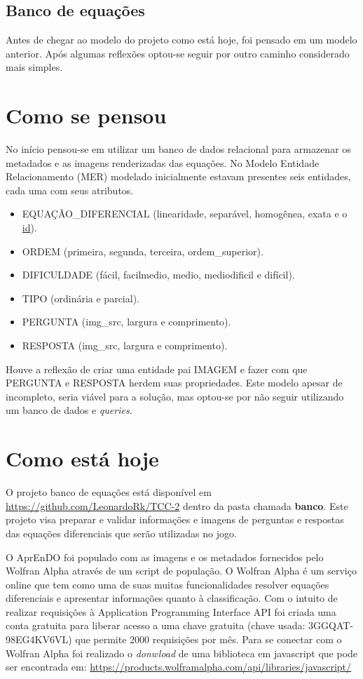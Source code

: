 \section[Banco de equações]{Banco de equações}
Antes de chegar ao modelo do projeto como está hoje, foi pensado em um modelo anterior. Após algumas reflexões
optou-se seguir por outro caminho considerado mais simples.

\chapter[Como se pensou]{Como se pensou}

No início pensou-se em utilizar um banco de dados relacional para armazenar os metadados e as imagens renderizadas das equações. No Modelo Entidade Relacionamento (MER) modelado inicialmente estavam presentes seis entidades, cada uma com seus atributos. 

\begin{itemize}
	\item EQUAÇÃO\_DIFERENCIAL (linearidade, separável, homogênea, exata e o \underline{id}).
	\item ORDEM (primeira, segunda, terceira, ordem\_superior).
	\item DIFICULDADE (fácil, facilmedio, medio, mediodificil e difícil).
	\item TIPO (ordinária e parcial).
	\item PERGUNTA (img\_src, largura e comprimento).
	\item RESPOSTA (img\_src, largura e comprimento).
\end{itemize}

Houve a reflexão de criar uma entidade pai IMAGEM e fazer com que PERGUNTA e RESPOSTA herdem suas propriedades. Este modelo apesar de incompleto, seria viável para a solução, mas optou-se por não seguir utilizando um banco de dados e \textit{queries}.

\chapter[Como está hoje]{Como está hoje}

O projeto banco de equações está disponível em \url{https://github.com/LeonardoRk/TCC-2} dentro da pasta chamada \textbf{banco}. Este projeto visa preparar e validar informações e imagens de perguntas e respostas das equações diferenciais que serão utilizadas no jogo.

O AprEnDO foi populado com as imagens e os metadados fornecidos pelo Wolfran Alpha através de um script de população. O Wolfran Alpha é um serviço online que tem como uma de suas muitas funcionalidades resolver equações diferenciais e apresentar informações quanto à classificação. Com o intuito de realizar requisições à Application Programming Interface API foi criada uma conta gratuita para liberar acesso a uma chave gratuita (chave usada: 3GGQAT-98EG4KV6VL) que permite 2000 requisições por mês. Para se conectar com o Wolfran Alpha foi realizado o \textit{donwload} de uma biblioteca em javascript que pode ser encontrada em: \url{https://products.wolframalpha.com/api/libraries/javascript/} 

